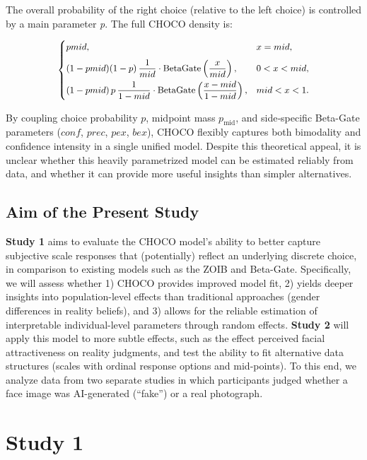 \documentclass[
  jou,
  floatsintext,
  longtable,
  nolmodern,
  notxfonts,
  notimes,
  colorlinks=true,linkcolor=blue,citecolor=blue,urlcolor=blue]{apa7}
\begin{document}
The overall probability of the right choice (relative to the left
choice) is controlled by a main parameter \emph{p}. The full CHOCO
density is:

\[
\small
\begin{cases}
pmid, & x = mid, \\[6pt]
(1 - pmid)(1 - p)\,\dfrac{1}{mid} \cdot \mathrm{BetaGate}\left(\dfrac{x}{mid}\right), & 0 < x < mid, \\[6pt]
(1 - pmid)\,p\,\dfrac{1}{1 - mid} \cdot \mathrm{BetaGate}\left(\dfrac{x - mid}{1 - mid}\right), & mid < x < 1. \\
\end{cases}
\]

By coupling choice probability \(p\), midpoint mass \(p_{\text{mid}}\),
and side‐specific Beta-Gate parameters (\(conf\), \(prec\), \(pex\),
\(bex\)), CHOCO flexibly captures both bimodality and confidence
intensity in a single unified model. Despite this theoretical appeal, it
is unclear whether this heavily parametrized model can be estimated
reliably from data, and whether it can provide more useful insights than
simpler alternatives.

\subsection{Aim of the Present Study}\label{aim-of-the-present-study}

\textbf{Study 1} aims to evaluate the CHOCO model's ability to better
capture subjective scale responses that (potentially) reflect an
underlying discrete choice, in comparison to existing models such as the
ZOIB and Beta-Gate. Specifically, we will assess whether 1) CHOCO
provides improved model fit, 2) yields deeper insights into
population-level effects than traditional approaches (gender differences
in reality beliefs), and 3) allows for the reliable estimation of
interpretable individual-level parameters through random effects.
\textbf{Study 2} will apply this model to more subtle effects, such as
the effect perceived facial attractiveness on reality judgments, and
test the ability to fit alternative data structures (scales with ordinal
response options and mid-points). To this end, we analyze data from two
separate studies in which participants judged whether a face image was
AI-generated (``fake'') or a real photograph.

\section{Study 1}\label{study-1}
\end{document}
